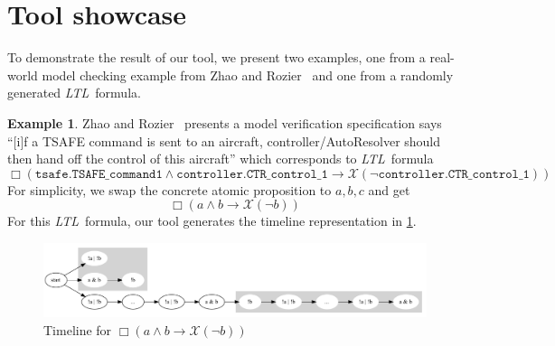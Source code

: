 \documentclass[preprint,12pt]{elsarticle}
\theoremstyle{definition}
\newtheorem{example}{Example}[section]
\theoremstyle{remark}
\newcommand{\always}{\Box}
\newcommand{\nextt}{\mathcal{X}}
\newcommand{\limplies}{\rightarrow}
\newcommand{\ltl}{\textit{LTL}}
\begin{document}
\section{Tool showcase}
To demonstrate the result of our tool, we present two examples, one from a real-world model checking example from Zhao and Rozier~\cite{ZR14} and one from a randomly generated \ltl\ formula.

\begin{example}
    Zhao and Rozier~\cite{ZR14} presents a model verification specification says ``[i]f a TSAFE command is sent to an aircraft, controller/AutoResolver should then hand off the control of this aircraft'' which corresponds to \ltl\ formula
    \[
        \always (\texttt{tsafe.TSAFE\_command1} \land \texttt{controller.CTR\_control\_1} \limplies \nextt (\neg \texttt{controller.CTR\_control\_1}))
    \]
    For simplicity, we swap the concrete atomic proposition to $a, b, c$ and get
    \[
        \always (a \land b \limplies \nextt (\neg b))
    \]
    For this \ltl\ formula, our tool generates the timeline representation in \cref{fig:ex14}.
    \begin{figure}[h!]
        \centering
        \includegraphics[scale=0.3]{examples/ex14/ex14.png}
        \caption{Timeline for $\always (a \land b \limplies \nextt (\neg b))$}
        \label{fig:ex14}
    \end{figure}
\end{example}
\end{document}
